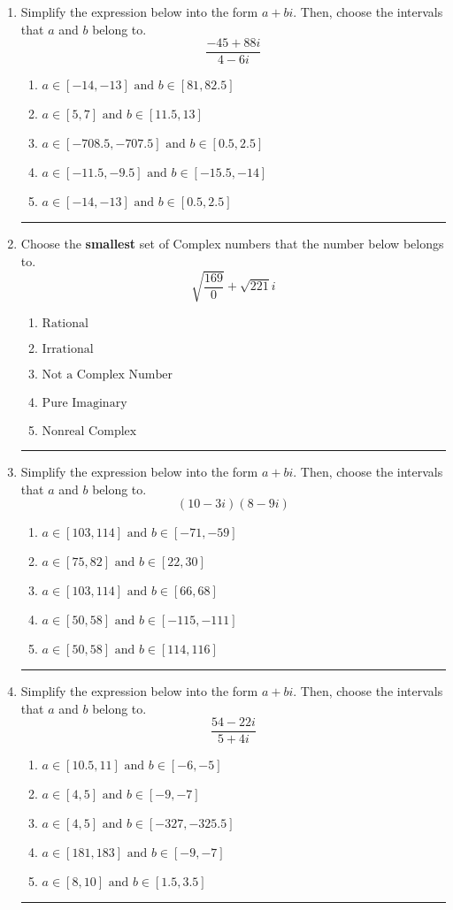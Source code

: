\documentclass[14pt]{extbook}
\newcommand{\litem}[1]{\item#1\hspace*{-1cm}\rule{\textwidth}{0.4pt}}
\begin{document}
\begin{enumerate}
{\begin{enumerate}[label=\Alph*.]
\end{enumerate} }
\litem{
Simplify the expression below into the form $a+bi$. Then, choose the intervals that $a$ and $b$ belong to.\[ \frac{-45 + 88 i}{4 - 6 i} \]\begin{enumerate}[label=\Alph*.]
\item \( a \in [-14, -13] \text{ and } b \in [81, 82.5] \)
\item \( a \in [5, 7] \text{ and } b \in [11.5, 13] \)
\item \( a \in [-708.5, -707.5] \text{ and } b \in [0.5, 2.5] \)
\item \( a \in [-11.5, -9.5] \text{ and } b \in [-15.5, -14] \)
\item \( a \in [-14, -13] \text{ and } b \in [0.5, 2.5] \)

\end{enumerate} }
\litem{
Choose the \textbf{smallest} set of Complex numbers that the number below belongs to.\[ \sqrt{\frac{169}{0}}+\sqrt{221} i \]\begin{enumerate}[label=\Alph*.]
\item \( \text{Rational} \)
\item \( \text{Irrational} \)
\item \( \text{Not a Complex Number} \)
\item \( \text{Pure Imaginary} \)
\item \( \text{Nonreal Complex} \)

\end{enumerate} }
\litem{
Simplify the expression below into the form $a+bi$. Then, choose the intervals that $a$ and $b$ belong to.\[ (10 - 3 i)(8 - 9 i) \]\begin{enumerate}[label=\Alph*.]
\item \( a \in [103, 114] \text{ and } b \in [-71, -59] \)
\item \( a \in [75, 82] \text{ and } b \in [22, 30] \)
\item \( a \in [103, 114] \text{ and } b \in [66, 68] \)
\item \( a \in [50, 58] \text{ and } b \in [-115, -111] \)
\item \( a \in [50, 58] \text{ and } b \in [114, 116] \)

\end{enumerate} }
\litem{
Simplify the expression below into the form $a+bi$. Then, choose the intervals that $a$ and $b$ belong to.\[ \frac{54 - 22 i}{5 + 4 i} \]\begin{enumerate}[label=\Alph*.]
\item \( a \in [10.5, 11] \text{ and } b \in [-6, -5] \)
\item \( a \in [4, 5] \text{ and } b \in [-9, -7] \)
\item \( a \in [4, 5] \text{ and } b \in [-327, -325.5] \)
\item \( a \in [181, 183] \text{ and } b \in [-9, -7] \)
\item \( a \in [8, 10] \text{ and } b \in [1.5, 3.5] \)


\end{enumerate}}
\end{enumerate}
\end{document}

